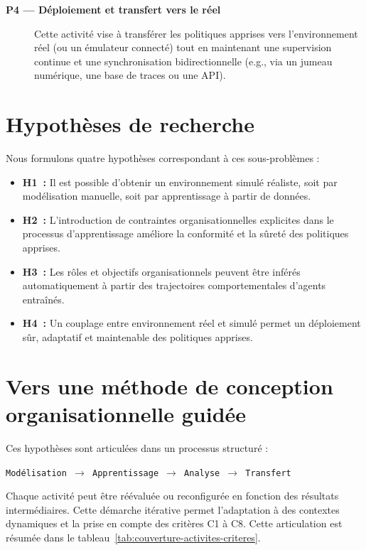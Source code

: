 \begin{description}
    \item[\textbf{P4 — Déploiement et transfert vers le réel}]
          Cette activité vise à transférer les politiques apprises vers l’environnement réel (ou un émulateur connecté) tout en maintenant une supervision continue et une synchronisation bidirectionnelle (e.g., via un jumeau numérique, une base de traces ou une API).
\end{description}

\section{Hypothèses de recherche}

Nous formulons quatre hypothèses correspondant à ces sous-problèmes :

\begin{itemize}
    \item \textbf{H1~:} Il est possible d’obtenir un environnement simulé réaliste, soit par modélisation manuelle, soit par apprentissage à partir de données.
    \item \textbf{H2~:} L’introduction de contraintes organisationnelles explicites dans le processus d’apprentissage améliore la conformité et la sûreté des politiques apprises.
    \item \textbf{H3~:} Les rôles et objectifs organisationnels peuvent être inférés automatiquement à partir des trajectoires comportementales d’agents entraînés.
    \item \textbf{H4~:} Un couplage entre environnement réel et simulé permet un déploiement sûr, adaptatif et maintenable des politiques apprises.
\end{itemize}

\section{Vers une méthode de conception organisationnelle guidée}

Ces hypothèses sont articulées dans un processus structuré :
\begin{center}
    \texttt{Modélisation $\rightarrow$ Apprentissage $\rightarrow$ Analyse $\rightarrow$ Transfert}
\end{center}

\noindent
Chaque activité peut être réévaluée ou reconfigurée en fonction des résultats intermédiaires. Cette démarche itérative permet l’adaptation à des contextes dynamiques et la prise en compte des critères C1 à C8.
%
Cette articulation est résumée dans le tableau~\ref{tab:couverture-activites-criteres}.


